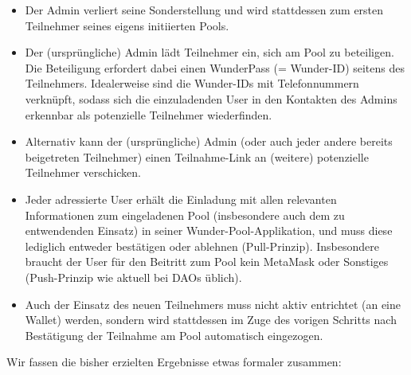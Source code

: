 \begin{itemize}
	\item Der Admin verliert seine Sonderstellung und wird stattdessen zum ersten Teilnehmer seines eigens initiierten Pools. 
	\item Der (ursprüngliche) Admin lädt Teilnehmer ein, sich am Pool zu beteiligen. Die Beteiligung erfordert dabei einen WunderPass (= Wunder-ID) seitens des Teilnehmers. Idealerweise sind die Wunder-IDs mit Telefonnummern verknüpft, sodass sich die einzuladenden User in den Kontakten des Admins erkennbar als potenzielle Teilnehmer wiederfinden.
	\item Alternativ kann der (ursprüngliche) Admin (oder auch jeder andere bereits beigetreten Teilnehmer) einen Teilnahme-Link an (weitere) potenzielle Teilnehmer verschicken.
	\item Jeder adressierte User erhält die Einladung mit allen relevanten Informationen zum eingeladenen Pool (insbesondere auch dem zu entwendenden Einsatz) in seiner Wunder-Pool-Applikation, und muss diese lediglich entweder bestätigen oder ablehnen (Pull-Prinzip). Insbesondere braucht der User für den Beitritt zum Pool kein MetaMask oder Sonstiges (Push-Prinzip wie aktuell bei DAOs üblich). 
	\item Auch der Einsatz des neuen Teilnehmers muss nicht aktiv entrichtet (an eine Wallet) werden, sondern wird stattdessen im Zuge des vorigen Schritts nach Bestätigung der Teilnahme am Pool automatisch eingezogen.
\end{itemize}

\vspace{0.2cm}

Wir fassen die bisher erzielten Ergebnisse etwas formaler zusammen:

\vspace{0.2cm}

